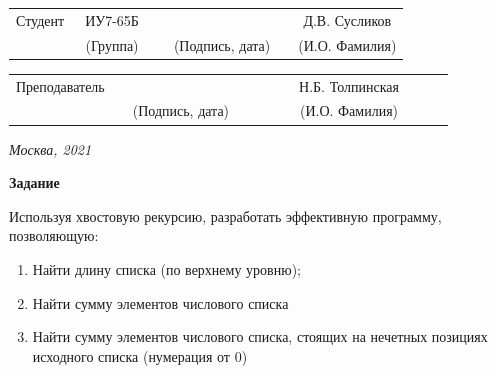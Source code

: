 \documentclass[12pt, a4paper]{extarticle}
\begin{document}
\noindent
{}
\\

\noindent
{}
\\

\vspace{1.5cm}
\noindent
\begin{tabular}{l c c c c c}
	Студент      & ~ИУ7-65Б~               & \hspace{2.5cm} & \hspace{2cm}                 & &  Д.В. Сусликов \\\cline{2-2}\cline{4-4} \cline{6-6} 
	\hspace{3cm} & {\footnotesize(Группа)} &                & {\footnotesize(Подпись, дата)} & & {\footnotesize(И.О. Фамилия)}
\end{tabular}

\noindent
\begin{tabular}{l c c c c}
	Преподаватель & \hspace{5cm}   & \hspace{2cm}                 & & ~~~~~~Н.Б. Толпинская~~~~~~\\\cline{3-3} \cline{5-5} 
	\hspace{3cm}  &                & {\footnotesize(Подпись, дата)} & & {\footnotesize(И.О. Фамилия)}
\end{tabular}

\vspace{0.6cm}
\begin{center}	
	\vfill
	\large \textit {Москва, 2021}
\end{center}

\thispagestyle {empty}
\pagebreak

\clearpage

\textbf{Задание}

Используя хвостовую рекурсию, разработать эффективную программу, позволяющую:
\begin{enumerate}
	\item Найти длину списка (по верхнему уровню);
	\item Найти сумму элементов числового списка 
	\item Найти сумму элементов числового списка, стоящих на нечетных позициях исходного списка (нумерация от 0) 
\end{enumerate}
\end{document}
